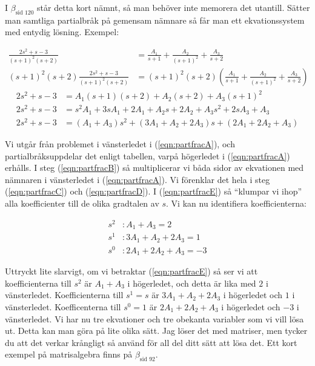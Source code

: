 \documentclass[a4paper]{article}
\newcommand{\mhb}[1]{$\beta_{\text{#1}}$}     %
\begin{document}
I \mhb{sid 120} står detta kort nämnt, så man behöver inte memorera det utantill. Sätter man samtliga partialbråk på gemensam nämnare så får man ett ekvationssystem med entydig lösning. Exempel:

\begin{align}
  \frac{2s^2 + s -3}{(s+1)^2(s+2)} &= \frac{A_1}{s+1} + \frac{A_2}{(s+1)^2} + \frac{A_3}{s+2} \label{eqn:partfracA}\\
  (s+1)^2(s+2) \frac{2s^2 + s -3}{(s+1)^2(s+2)} &= (s+1)^2(s+2) \left( \frac{A_1}{s+1} + \frac{A_2}{(s+1)^2} + \frac{A_3}{s+2} \right) \label{eqn:partfracB}
\end{align}
\vspace{-7mm}
\begin{align}
  2s^2 + s -3 &= A_1(s+1)(s+2) + A_2(s+2) + A_3(s+1)^2 \label{eqn:partfracC}\\
  2s^2 + s -3 &= s^2A_1 + 3sA_1 + 2A_1 + A_2s + 2A_2 + A_3s^2 + 2sA_3 + A_3 \label{eqn:partfracD}\\
  2s^2 + s -3 &= (A_1 + A_3)s^2 + (3A_1 + A_2 + 2A_3)s + (2A_1 + 2A_2 + A_3) \label{eqn:partfracE}
\end{align}

Vi utgår från problemet i vänsterledet i (\ref{eqn:partfracA}), och partialbråksuppdelar det enligt tabellen, varpå högerledet i (\ref{eqn:partfracA}) erhålls. I steg (\ref{eqn:partfracB}) så multiplicerar vi båda sidor av ekvationen med nämnaren i vänsterledet i (\ref{eqn:partfracA}). Vi förenklar det hela i steg (\ref{eqn:partfracC}) och (\ref{eqn:partfracD}). I (\ref{eqn:partfracE}) så ``klumpar vi ihop'' alla koefficienter till de olika gradtalen av $s$. Vi kan nu identifiera koefficienterna:

\begin{align*}
  s^2 &: A_1 + A_3 = 2\\
  s^1 &: 3A_1 + A_2 + 2A_3 = 1\\
  s^0 &: 2A_1 + 2A_2 + A_3 = -3
\end{align*}

Uttryckt lite slarvigt, om vi betraktar (\ref{eqn:partfracE}) så ser vi att koefficienterna till $s^2$ är $A_1 + A_3$ i högerledet, och detta är lika med $2$ i vänsterledet. Koefficienterna till $s^1 = s$ är $3A_1 + A_2 + 2A_3$ i högerledet och $1$ i vänsterledet. Koefficenterna till $s^0 = 1$ är $2A_1 + 2A_2 + A_3$ i högerledet och $-3$ i vänsterledet. Vi har nu tre ekvationer och tre obekanta variabler som vi vill lösa ut. Detta kan man göra på lite olika sätt. Jag löser det med matriser, men tycker du att det verkar krångligt så använd för all del ditt sätt att lösa det. Ett kort exempel på matrisalgebra finns på \mhb{sid 92}.
\end{document}
